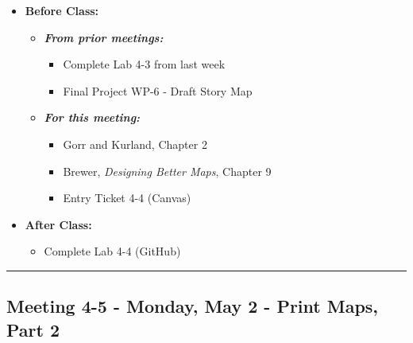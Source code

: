 \documentclass[
]{book}
\providecommand{\tightlist}{%
  \setlength{\itemsep}{0pt}\setlength{\parskip}{0pt}}
\begin{document}
\begin{itemize}
\tightlist
\item
  \textbf{Before Class:}

  \begin{itemize}
  \tightlist
  \item
    \textbf{\emph{From prior meetings:}}

    \begin{itemize}
    \tightlist
    \item
      Complete Lab 4-3 from last week
    \item
      Final Project WP-6 - Draft Story Map
    \end{itemize}
  \item
    \textbf{\emph{For this meeting:}}

    \begin{itemize}
    \tightlist
    \item
      Gorr and Kurland, Chapter 2
    \item
      Brewer, \emph{Designing Better Maps}, Chapter 9
    \item
      Entry Ticket 4-4 (Canvas)
    \end{itemize}
  \end{itemize}
\item
  \textbf{After Class:}

  \begin{itemize}
  \tightlist
  \item
    Complete Lab 4-4 (GitHub)
  \end{itemize}
\end{itemize}

\begin{center}\rule{0.5\linewidth}{0.5pt}\end{center}

\hypertarget{meeting-4-5---monday-may-2---print-maps-part-2}{%
\subsection*{Meeting 4-5 - Monday, May 2 - Print Maps, Part 2}\label{meeting-4-5---monday-may-2---print-maps-part-2}}
\end{document}
